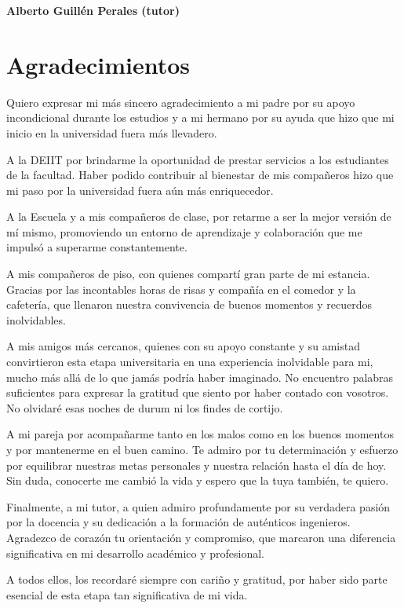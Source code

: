\noindent \textbf{Alberto Guillén Perales (tutor)}

\chapter*{Agradecimientos}
\thispagestyle{empty}

\vspace{1cm}

Quiero expresar mi más sincero agradecimiento a mi padre por su apoyo incondicional durante los estudios y a mi hermano por su ayuda que hizo que mi inicio en la universidad fuera más llevadero.

\vspace{2.5mm}

A la DEIIT por brindarme la oportunidad de prestar servicios a los estudiantes de la facultad. Haber podido contribuir al bienestar de mis compañeros hizo que mi paso por la universidad fuera aún más enriquecedor.

\vspace{2.5mm}

A la Escuela y a mis compañeros de clase, por retarme a ser la mejor versión de mí mismo, promoviendo un entorno de aprendizaje y colaboración que me impulsó a superarme constantemente.

\vspace{2.5mm}

A mis compañeros de piso, con quienes compartí gran parte de mi estancia. Gracias por las incontables horas de risas y compañía en el comedor y la cafetería, que llenaron nuestra convivencia de buenos momentos y recuerdos inolvidables.

\vspace{2.5mm}

A mis amigos más cercanos, quienes con su apoyo constante y su amistad convirtieron esta etapa universitaria en una experiencia inolvidable para mi, mucho más allá de lo que jamás podría haber imaginado. No encuentro palabras suficientes para expresar la gratitud que siento por haber contado con vosotros. No olvidaré esas noches de durum ni los findes de cortijo.

\vspace{2.5mm}

A mi pareja por acompañarme tanto en los malos como en los buenos momentos y por mantenerme en el buen camino. Te admiro por tu determinación y esfuerzo por equilibrar nuestras metas personales y nuestra relación hasta el día de hoy. Sin duda, conocerte me cambió la vida y espero que la tuya también, te quiero. 

\vspace{2.5mm}

Finalmente, a mi tutor, a quien admiro profundamente por su verdadera pasión por la docencia y su dedicación a la formación de auténticos ingenieros. Agradezco de corazón tu orientación y compromiso, que marcaron una diferencia significativa en mi desarrollo académico y profesional.

\vspace{2.5mm}

A todos ellos, los recordaré siempre con cariño y gratitud, por haber sido parte esencial de esta etapa tan significativa de mi vida.
